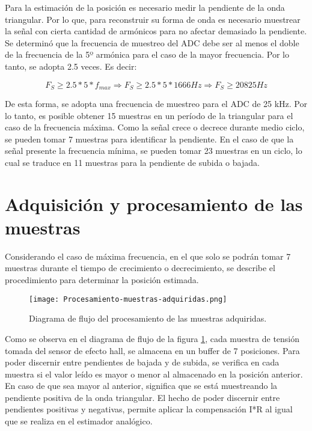 \noindent Para la estimación de la posición es necesario medir la pendiente de la onda triangular. Por lo que, para reconstruir su forma de onda es necesario muestrear la señal con cierta cantidad de armónicos para no afectar demasiado la pendiente. Se determinó que la frecuencia de muestreo del ADC debe ser al menos el doble de la frecuencia de la 5º armónica para el caso de la mayor frecuencia. Por lo tanto, se adopta 2.5 veces. Es decir:


\begin{equation} 
	F_S \geq 2.5 * 5 * f_{max} \Rightarrow  F_S \geq 2.5 * 5 * 1666 Hz \Rightarrow F_S \geq 20825 Hz
\end{equation}

\noindent De esta forma, se adopta una frecuencia de muestreo para el ADC de  25 kHz. Por lo tanto, es posible obtener 15 muestras en un período de la triangular para el caso de la frecuencia máxima. Como la señal crece o decrece durante medio ciclo, se pueden tomar 7 muestras para identificar la pendiente. En el caso de que la señal presente la frecuencia mínima, se pueden tomar 23 muestras en un ciclo, lo cual se traduce en 11 muestras para la pendiente de subida o bajada. 


\section{Adquisición y procesamiento de las muestras}

\noindent Considerando el caso de máxima frecuencia, en el que solo se podrán tomar 7 muestras durante el tiempo de crecimiento o decrecimiento, se describe el procedimiento para determinar la posición estimada.


\begin{figure}[H]
	\centering
	\texttt{[image: Procesamiento-muestras-adquiridas.png]}
	\caption{ Diagrama de flujo del procesamiento de las muestras adquiridas.}
	\label{fig:procesamiento-muestras-adquiridas}
\end{figure}


\noindent Como se observa en el diagrama de flujo de la figura \ref{fig:procesamiento-muestras-adquiridas}, cada muestra de tensión tomada del sensor de efecto hall, se almacena en un buffer de 7 posiciones. Para poder discernir entre pendientes de bajada y de subida, se verifica en cada muestra si el valor leído es mayor o menor al almacenado en la posición anterior. En caso de que sea mayor al anterior, significa que se está muestreando la pendiente positiva de la onda triangular. El hecho de poder discernir entre pendientes positivas y negativas, permite aplicar la compensación I*R al igual que se realiza en el estimador analógico. 


